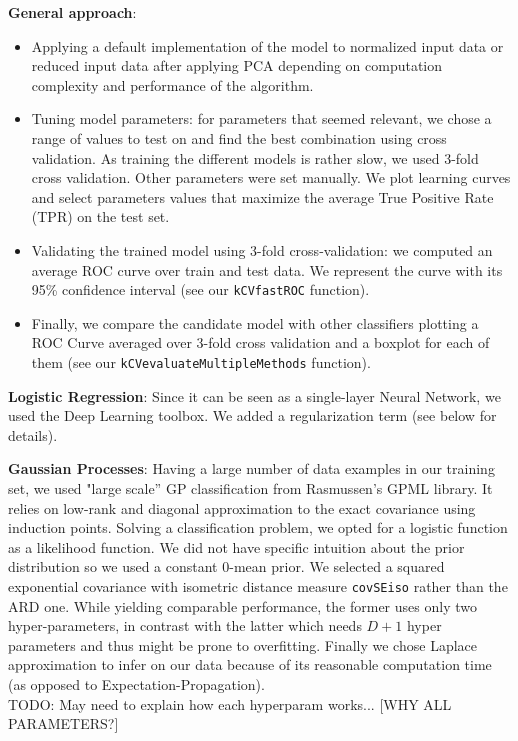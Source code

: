 \documentclass{article}
\begin{document}
  \textbf{General approach}:
   	\begin{itemize}
	   	\item Applying a default implementation of the model to normalized input data or reduced input data after applying PCA depending on computation complexity and performance of the algorithm.
    		\item Tuning model parameters: for parameters that seemed relevant, we chose a range of values to test on and find the best combination using cross validation. As training the different models is rather slow, we used 3-fold cross validation. Other parameters were set manually. We plot learning curves and select parameters values that maximize the average True Positive Rate (TPR) on the test set.
		  \item Validating the trained model using 3-fold cross-validation: we computed an average ROC curve over train and test data. We represent the curve with its 95\% confidence interval (see our \texttt{kCVfastROC} function).
  		\item Finally, we compare the candidate model with other classifiers plotting a ROC Curve averaged over 3-fold cross validation and a boxplot for each of them (see our \texttt{kCVevaluateMultipleMethods} function).
	\end{itemize}

  \textbf{Logistic Regression}: Since it can be seen as a single-layer Neural Network, we used the Deep Learning toolbox. We added a regularization term (see below for details).

  \textbf{Gaussian Processes}: Having a large number of data examples in our training set, we used "large scale'' GP classification from Rasmussen's GPML library. It relies on low-rank and diagonal approximation to the exact covariance using induction points. Solving a classification problem, we opted for a logistic function as a likelihood function. We did not have specific intuition about the prior distribution so we used a constant 0-mean prior. We selected a squared exponential covariance with isometric distance measure \texttt{covSEiso} rather than the ARD one. While yielding comparable performance, the former uses only two hyper-parameters, in contrast with the latter which needs $D+1$ hyper parameters and thus might be prone to overfitting. Finally we chose Laplace approximation to infer on our data because of its reasonable computation time (as opposed to Expectation-Propagation).\\
  TODO: May need to explain how each hyperparam works... [WHY ALL PARAMETERS?]
\end{document}
